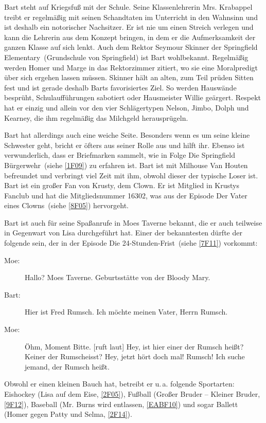 Bart steht auf Kriegsfuß mit der Schule. Seine Klassenlehrerin Mrs. Krabappel treibt er regelmäßig mit seinen Schandtaten im Unterricht in den Wahnsinn und ist deshalb ein notorischer Nachsitzer. Er ist nie um einen Streich verlegen und kann die Lehrerin aus dem Konzept bringen, in dem er die Aufmerksamkeit der ganzen Klasse auf sich lenkt. Auch dem Rektor Seymour Skinner der \glqq Springfield Elementary\grqq\ (Grundschule von Springfield) ist Bart wohlbekannt. Regelmäßig werden Homer und Marge in das Rektorzimmer zitiert, wo sie eine Moralpredigt über sich ergehen lassen müssen. Skinner hält an alten, zum Teil prüden Sitten fest und ist gerade deshalb Barts favorisiertes Ziel. So werden Hauswände besprüht, Schulaufführungen sabotiert oder Hausmeister Willie geärgert. Respekt hat er einzig und allein vor den vier Schlägertypen Nelson, Jimbo, Dolph und Kearney, die ihm regelmäßig das Milchgeld herausprügeln.

Bart hat allerdings auch eine weiche Seite. Besonders wenn es um seine kleine Schwester geht, bricht er öfters aus seiner Rolle aus und hilft ihr. Ebenso ist verwunderlich, dass er Briefmarken sammelt, wie in Folge \glqq Die Springfield Bürgerwehr\grqq\ (siehe \ref{1F09}) zu erfahren ist. Bart ist mit Milhouse Van Houten befreundet und verbringt viel Zeit mit ihm, obwohl dieser der typische Loser ist. Bart ist ein großer Fan von Krusty, dem Clown. Er ist Mitglied in Krustys Fanclub und hat die Mitgliedsnummer 16302, was aus der Episode \glqq Der Vater eines Clowns\grqq\ (siehe \ref{8F05}) hervorgeht.

Bart ist auch für seine Spaßanrufe in Moes Taverne bekannt, die er auch teilweise in Gegenwart von Lisa durchgeführt hat. Einer der bekanntesten dürfte der folgende sein, der in der Episode \glqq Die 24-Stunden-Frist\grqq\ (siehe \ref{7F11}) vorkommt:

\begin{description}
	\item [Moe:] \glqq Hallo? Moes Taverne. Geburtsstätte von der Bloody Mary.\grqq
	\item [Bart:] \glqq Hier ist Fred Rumsch. Ich möchte meinen Vater, Herrn Rumsch.\grqq
	\item [Moe:] \glqq Öhm, Moment Bitte. [ruft laut] Hey, ist hier einer der Rumsch heißt? Keiner der \glq Rumscheisst\grq ? Hey, jetzt hört doch mal! Rumsch! Ich suche jemand, der Rumsch heißt.\grqq
\end{description}

Obwohl er einen kleinen Bauch hat, betreibt er u.\,a. folgende Sportarten: Eishockey (\glqq Lisa auf dem Eise\grqq , \ref{2F05}), Fußball (\glqq Großer Bruder -- Kleiner Bruder\grqq , \ref{9F12}), Baseball (\glqq Mr. Burns wird entlassen\grqq , \ref{EABF10}) und sogar Ballett (\glqq Homer gegen Patty und Selma\grqq , \ref{2F14}).

